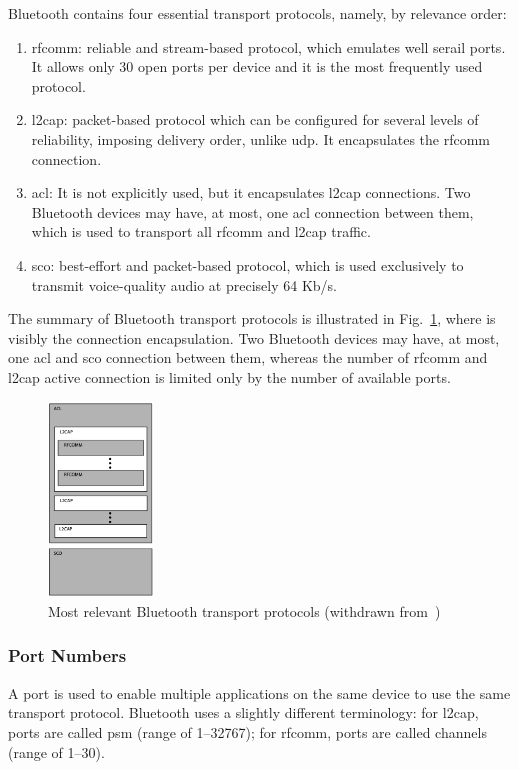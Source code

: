 Bluetooth contains four essential transport protocols, namely, by relevance
order:
\begin{enumerate}
\item \gls{rfcomm}: reliable and stream-based protocol, which emulates well
  serail ports. It allows only 30 open ports per device and it is the most
  frequently used protocol.
\item \gls{l2cap}: packet-based protocol which can be configured for several
  levels of reliability, imposing delivery order, unlike \gls{udp}. It
  encapsulates the \gls{rfcomm} connection.
\item \gls{acl}: It is not explicitly used, but it encapsulates \gls{l2cap}
  connections. Two Bluetooth devices may have, at most, one \gls{acl} connection
  between them, which is used to transport all \gls{rfcomm} and \gls{l2cap}
  traffic.
\item \gls{sco}: best-effort and packet-based protocol, which is used
  exclusively to transmit voice-quality audio at precisely 64 Kb/s.
\end{enumerate}
The summary of Bluetooth transport protocols is illustrated in
Fig.~\ref{fig:bt-transport-protocols-summary}, where is visibly the connection
encapsulation. Two Bluetooth devices may have, at most, one \gls{acl} and \gls{sco} connection
between them, whereas the number of \gls{rfcomm} and \gls{l2cap} active
connection is limited only by the number of available ports.
\begin{figure}[!hbt]
\centering
    \includegraphics[width=0.25\textwidth]{./img/bt-transport-protocols-summary.png}
  \caption{Most relevant Bluetooth transport protocols (withdrawn from~\cite{huang2007bluetooth})}%
\label{fig:bt-transport-protocols-summary}
\end{figure}
\newpage
%
\subsubsection{Port Numbers}%
\label{sec:bt-port-nrs}
%
A port is used to enable multiple applications on the same device to use the
same transport protocol. Bluetooth uses a slightly different terminology: for
\gls{l2cap}, ports are called \gls{psm} (range of 1--32767); for
\gls{rfcomm}, ports are called channels (range of 1--30).

